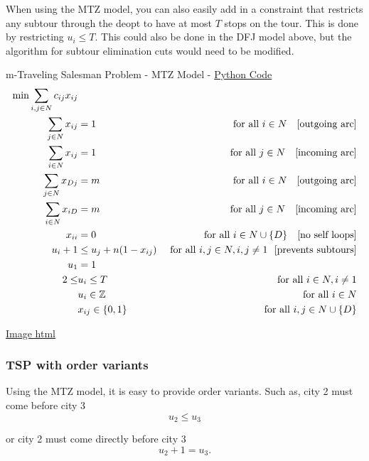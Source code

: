 When using the MTZ model, you can also easily add in a constraint that restricts any subtour through the deopt to have at most $T$ stops on the tour.  This is done by restricting $u_i \leq T$.  
This could also be done in the DFJ model above, but the algorithm for subtour elimination cuts would need to be modified.

\begin{general}{m-Traveling Salesman Problem - MTZ Model - }{}
\href{https://github.com/open-optimization/open-optimization-or-examples/blob/master/integer-programming/tsp-mtz/m_TSP_with_MTZ_Model.ipynb}{Python Code}
\begin{align}
\min \sum_{i,j \in N} c_{ij} x_{ij}\\
\sum_{j\in N} x_{ij} &= 1 & \mbox{ for all } i \in N \ \ \mbox{ [outgoing arc]}\\
\sum_{i \in N} x_{ij} &= 1 & \mbox{ for all } j \in N \ \ \mbox{ [incoming arc]}\\
\sum_{j\in N} x_{Dj} &= m & \mbox{ for all } i \in N \ \ \mbox{ [outgoing arc]}\\
\sum_{i \in N} x_{iD} &= m & \mbox{ for all } j \in N \ \ \mbox{ [incoming arc]}\\
x_{ii} &= 0 & \mbox{ for all } i \in N\cup\{D\} \ \ \mbox{ [no self loops]} \\
u_i + 1 & \leq u_j + n(1-x_{ij})  & \mbox{ for all } i,j \in N, i,j \neq 1 \ \ \mbox{[prevents subtours]}\\
u_1 &= 1\\
2 \leq & u_i \leq T & \mbox{ for all } i \in N, i \neq 1\\
& u_i \in {\mathbb{Z}} & \mbox{ for all } i \in N\\
& x_{ij} \in \{0,1\} & \mbox{ for all } i,j \in N\cup\{D\}
\end{align}
\end{general}

\href{https://github.com/open-optimization/open-optimization-or-examples/blob/master/integer-programming/tsp-mtz/houses_and_restaurants_assignment.html}{Image html}

\subsubsection{TSP with order variants}
Using the MTZ model, it is easy to provide order variants.  Such as, city 2 must come before city 3
$$
u_2 \leq u_3
$$

or city 2 must come directly before city 3
$$
u_2 + 1 = u_3.
$$



